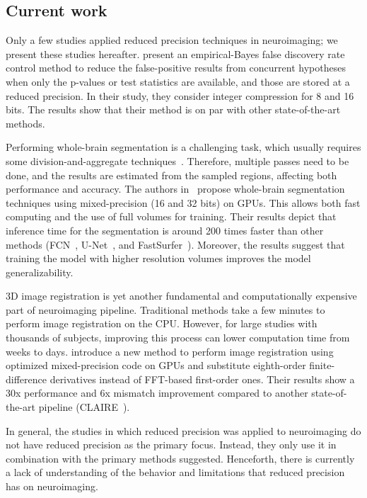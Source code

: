 \subsection{Current work}
Only a few studies applied reduced precision techniques in neuroimaging; we present these studies hereafter.
\cite{Nguyen2018-lo} present an empirical-Bayes false discovery rate
control method to reduce the false-positive results from concurrent hypotheses when
only the p-values or test statistics are available, and those are stored at a reduced precision. 
In their study, they consider integer compression for 8 and 16 bits.
The results show that their method is on par with other state-of-the-art methods.
		
Performing whole-brain segmentation is a challenging task, which usually requires
some division-and-aggregate techniques~\cite{Li2021-rv}.
Therefore, multiple passes need to be done, and the results are estimated from the sampled regions, affecting both performance and accuracy.
The authors in~\cite{Li2021-rv} propose whole-brain segmentation techniques using mixed-precision (16 and 32 bits) on GPUs.
This allows both fast computing and the use of full volumes for training. 
Their results depict that inference time for the segmentation is around 200 times
faster than other methods (FCN~\cite{Long2015-qr}, U-Net~\cite{Ronneberger2015-wy}, and FastSurfer~\cite{Henschel2020-vq}).
Moreover, the results suggest that training the model with higher resolution volumes improves the model generalizability.
		
3D image registration is yet another fundamental and computationally expensive part
of neuroimaging pipeline.
Traditional methods take a few minutes to perform image registration on the CPU.
However, for large studies with thousands of subjects, improving this process can lower computation time from weeks to days.
\cite{Brunn2021-zj} introduce a new method to perform image registration
using optimized mixed-precision code on GPUs and substitute eighth-order
finite-difference derivatives instead of FFT-based first-order ones.
Their results show a 30x performance and 6x mismatch improvement compared to
another state-of-the-art pipeline (CLAIRE~\cite{doi:10.1137/18M1207818}).
		
In general, the studies in which reduced precision was applied to neuroimaging do not have reduced precision as the primary focus.
Instead, they only use it in combination with the primary methods suggested.
Henceforth, there is currently a lack of understanding of the behavior and limitations that reduced precision has on neuroimaging.
	

